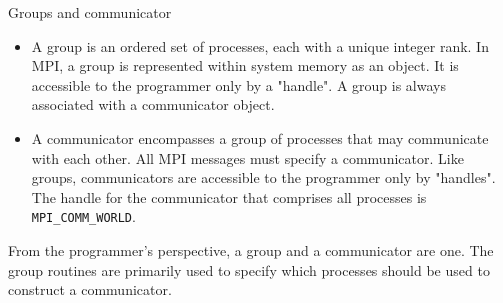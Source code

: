 \documentclass[aspectratio=43]{beamer}
\begin{document}
\begin{frame}[fragile]{Groups and communicator}
\begin{itemize}
\item A group is an ordered set of processes, each with a unique integer rank. In MPI, a group is represented within system memory as an object. It is accessible to the programmer only by a "handle". A group is always associated with a communicator object.
\item A communicator encompasses a group of processes that may communicate with each other. All MPI messages must specify a communicator. Like groups, communicators are accessible to the programmer only by "handles". The handle for the communicator that comprises all processes is \verb+MPI_COMM_WORLD+.
\end{itemize}
From the programmer's perspective, a group and a communicator are
one. The group routines are primarily used to specify which
processes should be used to construct a communicator.
\end{frame}
\end{document}
